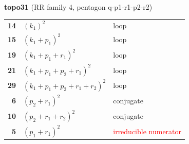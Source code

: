 \documentclass[10pt]{article}
\begin{document}
\begin{minipage}[t]{0.48\textwidth}
{}\\[2mm]\textbf{topo31} (RR family 4, pentagon q-p1-r1-p2-r2)\\[2pt]{\footnotesize\begin{tabular}{@{}r@{\ \ }l@{\ \ }l@{}}\textbf{14} & $(k_1)^2$ & loop\\
\textbf{15} & $(k_1+p_1)^2$ & loop\\
\textbf{19} & $(k_1+p_1+r_1)^2$ & loop\\
\textbf{21} & $(k_1+p_1+p_2+r_1)^2$ & loop\\
\textbf{29} & $(k_1+p_1+p_2+r_1+r_2)^2$ & loop\\
\textbf{6} & $(p_2+r_1)^2$ & conjugate\\
\textbf{10} & $(p_2+r_1+r_2)^2$ & conjugate\\
\textbf{5} & $(p_1+r_1)^2$ & \textcolor{red}{irreducible numerator}\\\end{tabular}}\end{minipage}\hfill%
\end{document}
